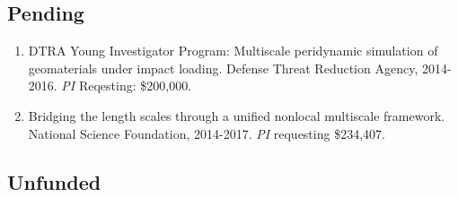 \subsection*{Pending}

\begin{enumerate}
  \item DTRA Young Investigator Program: Multiscale peridynamic simulation of geomaterials under impact loading. Defense Threat Reduction Agency, 2014-2016. \textit{PI} Reqesting: \$200,000.
  \item Bridging the length scales through a unified nonlocal multiscale framework. National Science Foundation, 2014-2017. \textit{PI} requesting \$234,407.
\end{enumerate}

\subsection*{Unfunded}


